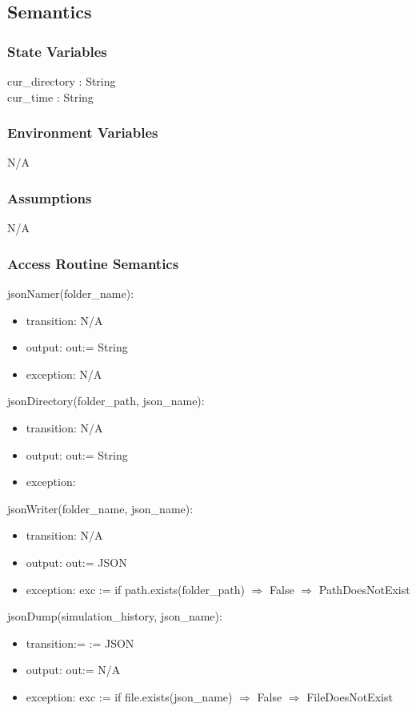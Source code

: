 \documentclass[12pt, titlepage]{article}
\begin{document}
\subsection{Semantics}

\subsubsection{State Variables}
cur\_directory : String \\
cur\_time : String

\subsubsection{Environment Variables}
N/A

\subsubsection{Assumptions}
N/A

\subsubsection{Access Routine Semantics}

\noindent jsonNamer(folder\_name):
\begin{itemize}
\item transition: N/A
\item output: out:= String
\item exception: N/A
\end{itemize}

\noindent jsonDirectory(folder\_path, json\_name):
\begin{itemize}
\item transition: N/A
\item output: out:= String
\item exception:   
\end{itemize}

\noindent jsonWriter(folder\_name, json\_name):
\begin{itemize}
\item transition: N/A
\item output: out:= JSON
\item exception: exc := if path.exists(folder\_path) $\Rightarrow$ False $\Rightarrow$ PathDoesNotExist
\end{itemize}

\noindent jsonDump(simulation\_history, json\_name):
\begin{itemize}
\item transition:= := JSON
\item output: out:= N/A
\item exception: exc := if file.exists(json\_name) $\Rightarrow$ False $\Rightarrow$ FileDoesNotExist
\end{itemize}
\end{document}
